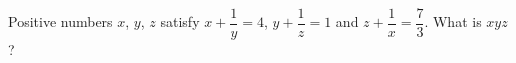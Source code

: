 Positive numbers $x$, $y$, $z$ satisfy $x+\dfrac1y=4$, $y+\dfrac1z=1$ and $z+\dfrac1x=\dfrac73$. What is $xyz$?
